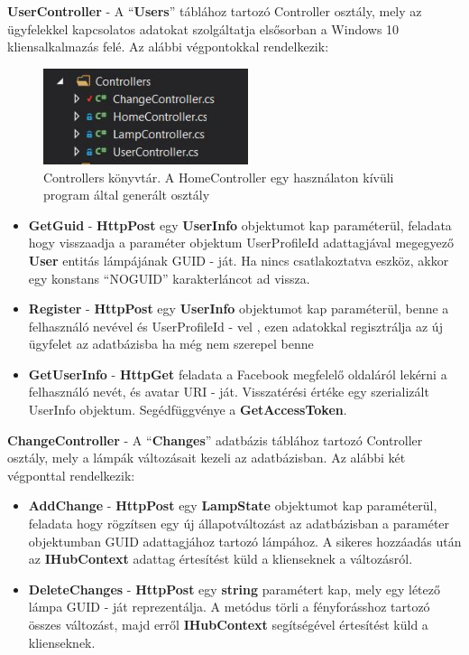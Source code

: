 \documentclass[a4paper,12pt]{report}
\begin{document}
    \textbf{UserController} - A ``\textbf{Users}'' táblához tartozó Controller osztály, mely az ügyfelekkel kapcsolatos adatokat szolgáltatja
    elsősorban a Windows 10 kliensalkalmazás felé. Az alábbi végpontokkal rendelkezik:

    \begin{figure}[H]
        \centering
        \includegraphics[width=6cm,keepaspectratio]{images/servicecontrollers.jpg}
        \caption{Controllers könyvtár. A HomeController egy használaton kívüli program által generált osztály}
        \label{fig: ControllersPackage}
    \end{figure}

    \begin{itemize}
        \item \textbf{GetGuid} - \textbf{HttpPost} egy \textbf{UserInfo} objektumot kap paraméterül, feladata hogy visszaadja a paraméter
        objektum UserProfileId adattagjával megegyező \textbf{User} entitás lámpájának GUID - ját. Ha nincs csatlakoztatva eszköz,
        akkor egy konstans ``NOGUID'' karakterláncot ad vissza.
        \item \textbf{Register} - \textbf{HttpPost} egy \textbf{UserInfo} objektumot kap paraméterül, benne a felhasználó nevével és UserProfileId - vel
        , ezen adatokkal regisztrálja az új ügyfelet az adatbázisba ha még nem szerepel benne
        \item \textbf{GetUserInfo} - \textbf{HttpGet} feladata a Facebook megfelelő oldaláról lekérni a felhasználó nevét, és avatar URI - ját.
        Visszatérési értéke egy szerializált UserInfo objektum. Segédfüggvénye a \textbf{GetAccessToken}.
    \end{itemize}

    \textbf{ChangeController} - A ``\textbf{Changes}'' adatbázis táblához tartozó Controller osztály, mely a lámpák változásait kezeli az adatbázisban.
    Az alábbi két végponttal rendelkezik:

    \begin{itemize}
        \item \textbf{AddChange} - \textbf{HttpPost} egy \textbf{LampState} objektumot kap paraméterül, feladata hogy rögzítsen egy új állapotváltozást
        az adatbázisban a paraméter objektumban GUID adattagjához tartozó lámpához. A sikeres hozzáadás után az \textbf{IHubContext} adattag értesítést
        küld a klienseknek a változásról.
        \item \textbf{DeleteChanges} - \textbf{HttpPost} egy \textbf{string} paramétert kap, mely egy létező lámpa GUID - ját reprezentálja. A metódus
        törli a fényforásshoz tartozó összes változást, majd erről \textbf{IHubContext} segítségével értesítést küld a klienseknek.
    \end{itemize}
\end{document}
